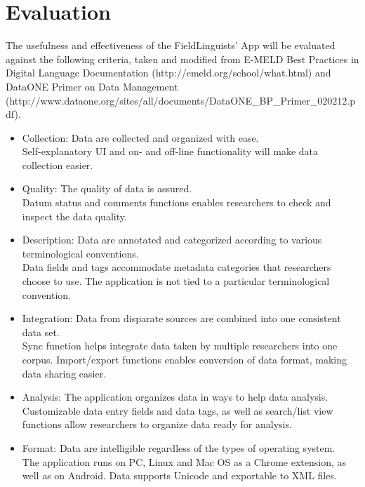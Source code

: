 \documentclass[12 pt]{article}
\begin{document}
\section {Evaluation}

The usefulness and effectiveness of the FieldLinguists' App will be evaluated against the following criteria, taken and modified from E-MELD Best Practices in Digital Language Documentation (http://emeld.org/school/what.html) and DataONE Primer on Data Management (http://www.dataone.org/sites/all/documents/DataONE\_BP\_Primer\_020212.pdf). 

\begin{itemize} 

\item Collection: Data are collected and organized with ease. \\ Self-explanatory UI and on- and off-line functionality will make data collection easier.    

\item Quality: The quality of data is assured. \\ Datum status and comments functions enables researchers to check and inspect the data quality.  

\item Description: Data are annotated and categorized according to various terminological conventions.  \\ Data fields and tags accommodate metadata categories that researchers choose to use. The application is not tied to a particular terminological convention. 

\item Integration: Data from disparate sources are combined into one consistent data set. \\ Sync function helps integrate data taken by multiple researchers into one corpus. Import/export functions enables conversion of data format, making data sharing easier.  

\item Analysis: The application organizes data in ways to help data analysis. \\  Customizable data entry fields and data tags, as well as search/list view functions allow researchers to organize data ready for analysis.  

\item Format: Data are intelligible regardless of the types of operating system. \\ The application runs on PC, Linux and Mac OS as a Chrome extension, as well as on Android. Data supports Unicode and exportable to XML files. 


\end{itemize}
\end{document}
